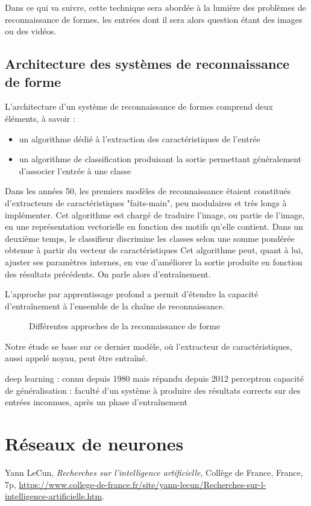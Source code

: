 \documentclass[a4paper,10pt]{report}
\begin{document}
Dans ce qui va suivre, cette technique sera abordée à la lumière des problèmes de reconnaissance de formes, les entrées dont il sera alors question étant des images ou des vidéos.

\subsection{Architecture des systèmes de reconnaissance de forme}


L'architecture d'un système de reconnaissance de formes comprend deux éléments, à savoir :

\begin{itemize}
\item un algorithme dédié à l'extraction des caractéristiques de l'entrée
\item un algorithme de classification produisant la sortie permettant généralement d'associer l'entrée à une classe
\end{itemize}

Dans les années 50, les premiers modèles de reconnaissance étaient constitués d'extracteurs de caractéristiques "faits-main", peu modulaires et très longs à implémenter\cite{LeCun_IA}.
Cet algorithme est chargé de traduire l'image, ou partie de l'image, en une représentation vectorielle en fonction des motifs qu'elle contient.
Dans un deuxième temps, le classifieur discrimine les classes selon une somme pondérée obtenue à partir du vecteur de caractéristiques
Cet algorithme peut, quant à lui, ajuster ses paramètres internes, en vue d'améliorer la sortie produite en fonction des résultats précédents. On parle alors d'entraînement.

L'approche par apprentissage profond a permit d'étendre la capacité d'entraînement à l'ensemble de la chaîne de reconnaissance.



\begin{figure}
    \centering
    \makebox[\textwidth]{}
    \caption{Différentes approches de la reconnaissance de forme}
    \label{fig:Fig1}
\end{figure}

Notre étude se base sur ce dernier modèle, où l'extracteur de caractéristiques, aussi appelé noyau, peut être entraîné.

deep learning : connu depuis 1980 mais répandu depuis 2012
perceptron
capacité de généralisation : faculté d'un système à produire des résultats corrects sur des entrées inconnues, après un phase d'entraînement

\section{Réseaux de neurones}

\begin{thebibliography}{9}

  Yann LeCun,
  \emph{Recherches sur l'intelligence artificielle},
  Collège de France, France,
  7p,
  \hyperref[Bib_LeCun]{https://www.college-de-france.fr/site/yann-lecun/Recherches-sur-l-intelligence-artificielle.htm}.

\end{thebibliography}
\end{document}
